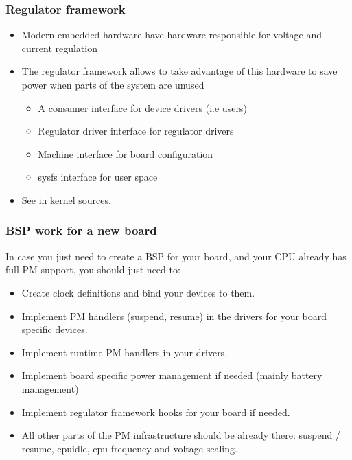 \begin{frame}
  \frametitle{Regulator framework}
  \begin{itemize}
  \item Modern embedded hardware have hardware responsible for voltage
    and current regulation
  \item The regulator framework allows to take advantage of this
    hardware to save power when parts of the system are unused
    \begin{itemize}
    \item A consumer interface for device drivers (i.e users)
    \item Regulator driver interface for regulator drivers
    \item Machine interface for board configuration
    \item sysfs interface for user space
    \end{itemize}
  \item See  in kernel sources.
  \end{itemize}
\end{frame}

\begin{frame}
  \frametitle{BSP work for a new board}
  In case you just need to create a BSP for your board, and your
  CPU already has full PM support, you should just need to:
  \begin{itemize}
  \item Create clock definitions and bind your devices to them.
  \item Implement PM handlers (suspend, resume) in the drivers for
    your board specific devices.
  \item Implement runtime PM handlers in your drivers.
  \item Implement board specific power management if needed (mainly
    battery management)
  \item Implement regulator framework hooks for your board if
    needed.
  \item All other parts of the PM infrastructure should be already
    there: suspend / resume, cpuidle, cpu frequency and voltage
    scaling.
  \end{itemize}
\end{frame}

